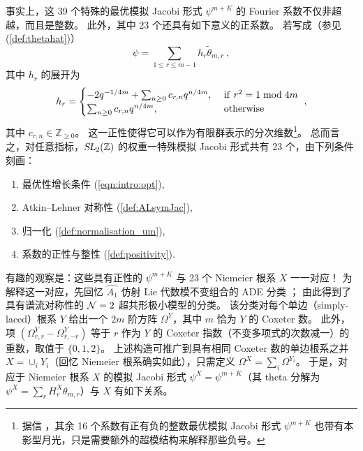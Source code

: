 \documentclass[11pt,a4paper,fontset=windows]{ctexart}
\numberwithin{equation}{section}
\newcommand{\SL}{\operatorname{\textsl{SL}}}      %
\newcommand{\ZZ}{\mathbb{Z}}
\newcommand{\xmod}{{\rm \;mod\;}}
\def\th{\theta}
\newcommand{\be}{\begin{equation}}
\newcommand{\ee}{\end{equation}}
\newcommand{\eq}[1]{(\ref{#1})}
\begin{document}

事实上，这 39 个特殊的最优模拟 Jacobi 形式 $\psi^{m+K}$ 的 Fourier 系数不仅非超越，而且是整数。
此外，其中 23 个还具有如下意义的正系数。
若写成（参见 \eq{def:thetahat}）
\[
\psi = \sum_{1\leq r\leq m-1}h_r \tilde \th_{m,r}~,\] 其中 $h_r$ 的展开为
\be \label{def:positivity}
h_r = \begin{cases} -2q^{-1/4m}+ \sum_{n\geq 0}c_{r,n} q^{n/4m}  ,~& {\rm{if} }~r^2=1\xmod{4m}  \\ 
\sum_{{n\geq 0}}c_{r,n} q^{n/4m}  ,~& \rm{otherwise }\end{cases}~,
\ee
其中
\(
c_{r,n} \in \ZZ_{\geq0}
\)。
这一正性使得它可以作为有限群表示的分次维数\footnote{据信 \cite{omjt}，其余 16 个系数有正有负的整数最优模拟 Jacobi 形式 $\psi^{m+K}$ 也带有本影型月光，只是需要额外的超模结构来解释那些负号。}。
总而言之，对任意指标，$\SL_2(\ZZ)$ 的权重一特殊模拟 Jacobi 形式共有 23 个，由下列条件刻画：
\vspace{-5pt}
\begin{enumerate}
\item 最优性增长条件 (\ref{eqn:intro:opt}), 
\vspace{-8pt}
\item Atkin--Lehner 对称性 \eq{def:ALsymJac},  
\vspace{-8pt}
\item 归一化 (\ref{def:normalisation_um}), 
\vspace{-8pt}
\item 系数的正性与整性 \eq{def:positivity}.
\end{enumerate}


有趣的观察是：这些具有正性的 $\psi^{m+K}$ 与 23 个 Niemeier 根系 $X$ 一一对应！
为解释这一对应，先回忆 $\widehat{A_1}$ 仿射 Lie 代数模不变组合的 ADE 分类 \cite{Cappelli:1987xt}；
由此得到了具有谱流对称性的 ${\cal N}=2$ 超共形极小模型的分类。
该分类对每个单边（simply-laced）根系 $Y$ 给出一个 $2m$ 阶方阵 $\Omega^Y$，其中 $m$ 恰为 $Y$ 的 Coxeter 数。
此外，项 $(\Omega^Y_{r,r}-\Omega^Y_{r,-r})$ 等于 $r$ 作为 $Y$ 的 Coxeter 指数（不变多项式的次数减一）的重数，取值于 $\{0,1,2\}$。
上述构造可推广到具有相同 Coxeter 数的单边根系之并 $X=\cup_i Y_i$（回忆 Niemeier 根系确实如此），只需定义 $\Omega^X= \sum_i \Omega^{Y_i}$。
于是，对应于 Niemeier 根系 $X$ 的模拟 Jacobi 形式 $\psi^X = \psi^{m+K}$（其 theta 分解为 $\psi^X=\sum_r H^X_r\theta_{m,r}$）与 $X$ 有如下关系。
\end{document}

